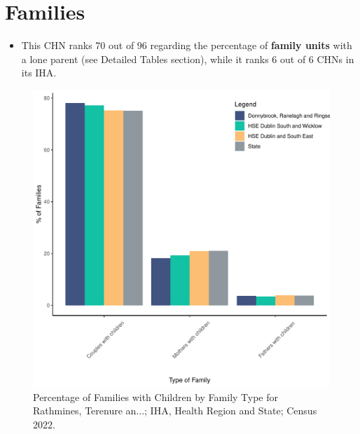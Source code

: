 \documentclass{article}
\begin{document}
\section{Families}\label{sect:Fam}
\begin{itemize}
\item This CHN ranks  70 out of 96 regarding the percentage of \textbf{family units} with a lone parent (see Detailed Tables section), while it ranks   6 out of 6 CHNs in its IHA.
\end{itemize}
\begin{figure}[H]
	\centering
	\includegraphics[width = 150mm]{../figures/FamED.pdf}
	\caption{Percentage of Families with Children by Family Type for Rathmines, Terenure an...; IHA, Health Region and State; Census 2022.}
	\label{fig:vbnv}
	\end{figure}
	
\end{document}
